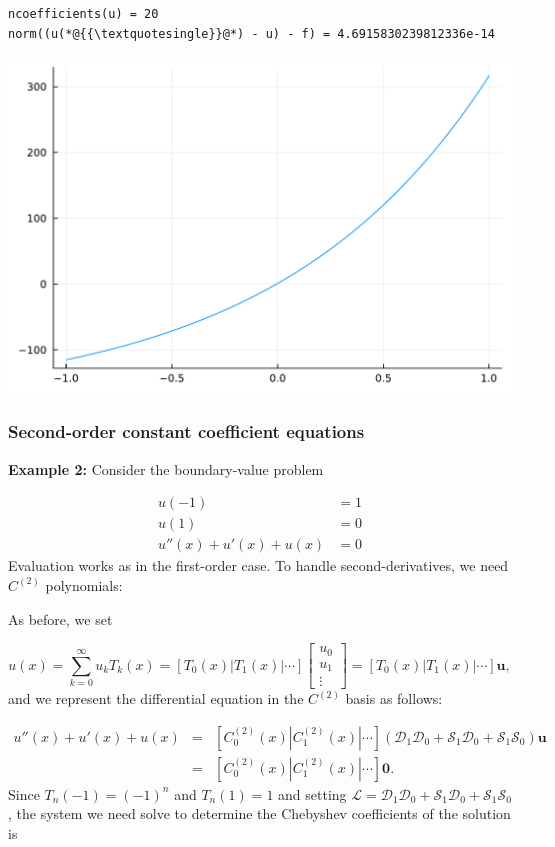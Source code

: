 \documentclass[12pt,a4paper]{article}
\begin{document}
\begin{lstlisting}
ncoefficients(u) = 20
norm((u(*@{{\textquotesingle}}@*) - u) - f) = 4.6915830239812336e-14
\end{lstlisting}

\includegraphics[width=\linewidth]{jl_GsbqQZ/Chapter4_28_1.pdf}

\subsubsection{Second-order constant coefficient equations}
\textbf{Example 2:}   Consider the boundary-value problem


\begin{align*}
u(-1) &= 1\\
u(1) &= 0\\
u''(x) + u'(x)  + u(x) &= 0
\end{align*}
Evaluation works as in the first-order case. To handle second-derivatives, we need $C^{(2)}$ polynomials:

As before, we set

\[
u(x) = \sum_{k=0}^\infty u_k T_k(x) = \left[ T_0(x) | T_1(x) | \cdots \right] \begin{bmatrix} u_0 \\ u_1 \\ \vdots \end{bmatrix}=  \left[ T_0(x) | T_1(x) | \cdots \right] \mathbf{u},
\]
and we represent the differential equation in the $C^{(2)}$ basis as follows:


\begin{eqnarray*}
u''(x) + u'(x)  + u(x)  &=& \left[ C_0^{(2)}(x) | C_1^{(2)}(x) | \cdots \right]\left(\mathcal{D}_1\mathcal{D}_0  + \mathcal{S}_1\mathcal{D}_0 + \mathcal{S}_1\mathcal{S}_0  \right) \mathbf{u} \\
 &=& \left[ C_0^{(2)}(x) | C_1^{(2)}(x) | \cdots \right]\mathbf{0}.
 \end{eqnarray*}
Since $T_n(-1) = (-1)^n$ and $T_n(1) = 1$ and setting $\mathcal{L} = \mathcal{D}_1\mathcal{D}_0  + \mathcal{S}_1\mathcal{D}_0 + \mathcal{S}_1\mathcal{S}_0$, the system we need solve to determine the Chebyshev coefficients of the solution is
\end{document}
